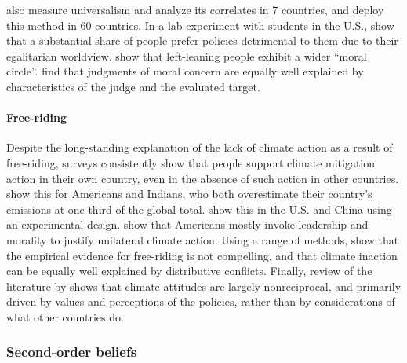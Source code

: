  also measure universalism and analyze its correlates in 7 countries, and  deploy this method in 60 countries. 
In a lab experiment with students in the U.S.,  show that a substantial share of people prefer policies detrimental to them due to their egalitarian worldview.  show that left-leaning people exhibit a wider ``moral circle''.  find that judgments of moral concern are equally well explained by characteristics of the judge and the evaluated target.

\paragraph{Free-riding}

Despite the long-standing explanation of the lack of climate action as a result of free-riding, surveys consistently show that people support climate mitigation action in their own country, even in the absence of such action in other countries.  show this for Americans and Indians, who both overestimate their country's emissions at one third of the global total.  show this in the U.S. and China using an experimental design.  show that Americans mostly invoke leadership and morality to justify unilateral climate action. Using a range of methods,  show that the empirical evidence for free-riding is not compelling, and that climate inaction can be equally well explained by distributive conflicts. Finally, review of the literature by  shows that climate attitudes are largely nonreciprocal, and primarily driven by values and perceptions of the policies, rather than by considerations of what other countries do. %

\subsubsection{Second-order beliefs}\label{subsubsec:literature_beliefs}

